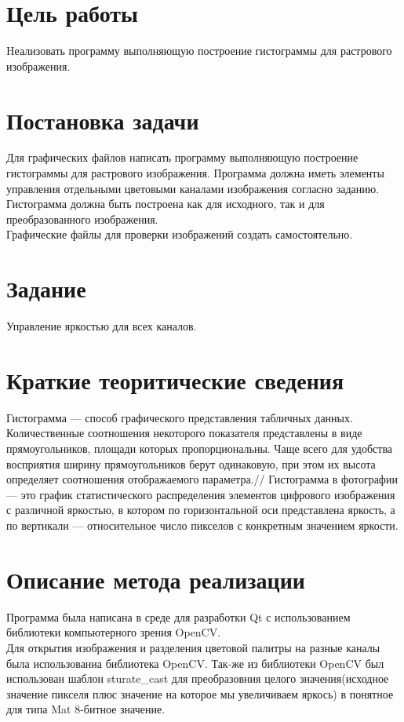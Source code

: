 \documentclass[russian,a4paper,12pt]{scrartcl}
\begin{document}
	\begin{flushleft}
		\section{Цель работы}
			Hеализовать программу выполняющую построение гистограммы для растрового изображения.
		\section{Постановка задачи}
			Для графических файлов написать программу выполняющую построение гистограммы для растрового изображения. Программа должна иметь элементы управления отдельными цветовыми каналами изображения согласно заданию. Гистограмма должна быть построена как для исходного, так и для преобразованного изображения.\\
			Графические файлы для проверки изображений создать самостоятельно.
		\section{Задание}
			Управление яркостью для всех каналов.
		\section{Краткие теоритические сведения}
			Гистограмма — способ графического представления табличных данных.\\
			Количественные соотношения некоторого показателя представлены в виде прямоугольников, площади которых пропорциональны. Чаще всего для удобства восприятия ширину прямоугольников берут одинаковую, при этом их высота определяет соотношения отображаемого параметра.//
			Гистограмма в фотографии — это график статистического распределения элементов цифрового изображения с различной яркостью, в котором по горизонтальной оси представлена яркость, а по вертикали — относительное число пикселов с конкретным значением яркости.
		\section{Описание метода реализации}
			Программа была написана в среде для разработки Qt с использованием библиотеки компьютерного зрения OpenCV.\\
			Для открытия изображения и разделения цветовой палитры на разные каналы была использованиа библиотека OpenCV. Так-же из библиотеки OpenCV был использован шаблон sturate\_cast для преобразовния целого значения(исходное значение пикселя плюс значение на которое мы увеличиваем яркось) в понятное для типа Mat 8-битное значение.
	\end{flushleft}
	\newpage
\end{document}
